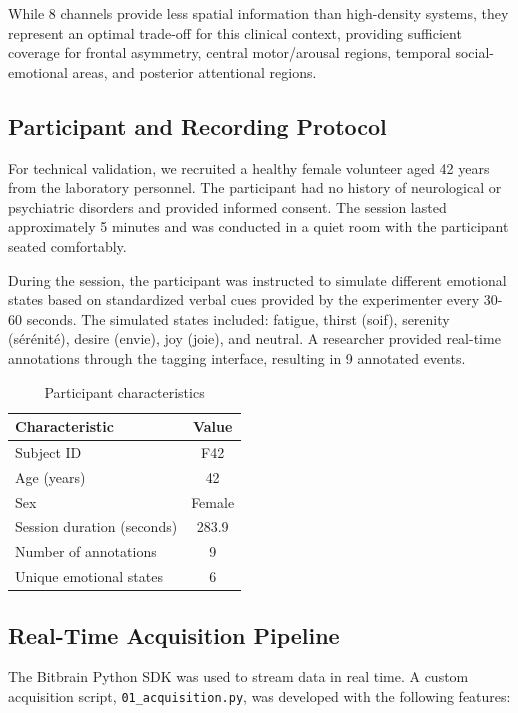 While 8 channels provide less spatial information than high-density systems, they represent an optimal trade-off for this clinical context, providing sufficient coverage for frontal asymmetry, central motor/arousal regions, temporal social-emotional areas, and posterior attentional regions.

\subsection{Participant and Recording Protocol}

For technical validation, we recruited a healthy female volunteer aged 42 years from the laboratory personnel. The participant had no history of neurological or psychiatric disorders and provided informed consent. The session lasted approximately 5 minutes and was conducted in a quiet room with the participant seated comfortably.

During the session, the participant was instructed to simulate different emotional states based on standardized verbal cues provided by the experimenter every 30-60 seconds. The simulated states included: fatigue, thirst (soif), serenity (sérénité), desire (envie), joy (joie), and neutral. A researcher provided real-time annotations through the tagging interface, resulting in 9 annotated events.

\begin{table}[H]
\centering
\caption{Participant characteristics}
\label{tab:participant}
\begin{tabular}{@{}lc@{}}
\toprule
\textbf{Characteristic} & \textbf{Value} \\
\midrule
Subject ID & F42 \\
Age (years) & 42 \\
Sex & Female \\
Session duration (seconds) & 283.9 \\
Number of annotations & 9 \\
Unique emotional states & 6 \\
\bottomrule
\end{tabular}
\end{table}

\subsection{Real-Time Acquisition Pipeline}

The Bitbrain Python SDK was used to stream data in real time. A custom acquisition script, \texttt{01\_acquisition.py}, was developed with the following features:

